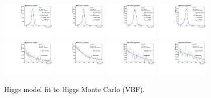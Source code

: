 \begin{figure}[thb]
  \centering
\includegraphics[width=0.23\textwidth]{figures/sec-signals/HiggsShapes/vbf_HM_signal_fit_mgg_cat0.pdf}
\includegraphics[width=0.23\textwidth]{figures/sec-signals/HiggsShapes/vbf_HM_signal_fit_mgg_cat1.pdf}
\includegraphics[width=0.23\textwidth]{figures/sec-signals/HiggsShapes/vbf_LM_signal_fit_mgg_cat0.pdf}
\includegraphics[width=0.23\textwidth]{figures/sec-signals/HiggsShapes/vbf_LM_signal_fit_mgg_cat1.pdf}
\includegraphics[width=0.23\textwidth]{figures/sec-signals/HiggsShapes/vbf_HM_signal_fit_mjj_cat0.pdf}
\includegraphics[width=0.23\textwidth]{figures/sec-signals/HiggsShapes/vbf_HM_signal_fit_mjj_cat1.pdf}
\includegraphics[width=0.23\textwidth]{figures/sec-signals/HiggsShapes/vbf_LM_signal_fit_mjj_cat0.pdf}
\includegraphics[width=0.23\textwidth]{figures/sec-signals/HiggsShapes/vbf_LM_signal_fit_mjj_cat1.pdf}
  \caption{Higgs model fit to Higgs Monte Carlo (VBF).}
  \label{fig:higgs_fit_vbf}
\end{figure}

